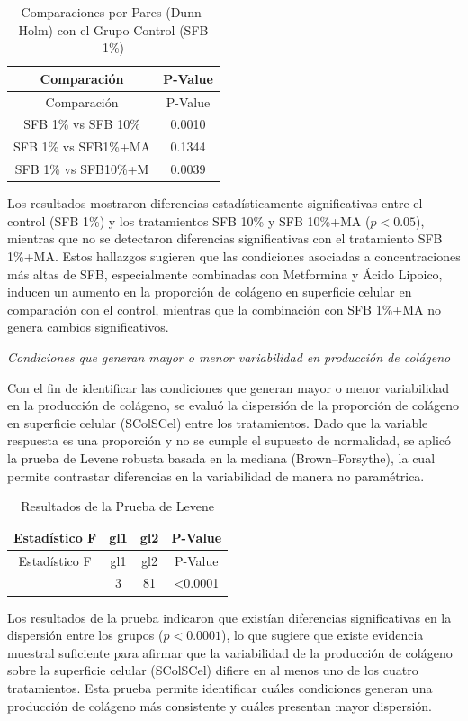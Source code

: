 \documentclass[
  11pt,
]{article}
\begin{document}
\begin{longtable}[]{@{}cc@{}}
\caption{Comparaciones por Pares (Dunn-Holm) con el Grupo Control (SFB
1\%)}\tabularnewline
\toprule\noalign{}
Comparación & P-Value \\
\midrule\noalign{}
\endfirsthead
\toprule\noalign{}
Comparación & P-Value \\
\midrule\noalign{}
\endhead
\bottomrule\noalign{}
\endlastfoot
SFB 1\% vs SFB 10\% & 0.0010 \\
SFB 1\% vs SFB1\%+MA & 0.1344 \\
SFB 1\% vs SFB10\%+M & 0.0039 \\
\end{longtable}

Los resultados mostraron diferencias estadísticamente significativas
entre el control (SFB 1\%) y los tratamientos SFB 10\% y SFB 10\%+MA
(\(p < 0.05\)), mientras que no se detectaron diferencias significativas
con el tratamiento SFB 1\%+MA. Estos hallazgos sugieren que las
condiciones asociadas a concentraciones más altas de SFB, especialmente
combinadas con Metformina y Ácido Lipoico, inducen un aumento en la
proporción de colágeno en superficie celular en comparación con el
control, mientras que la combinación con SFB 1\%+MA no genera cambios
significativos.

\emph{Condiciones que generan mayor o menor variabilidad en producción
de colágeno}

Con el fin de identificar las condiciones que generan mayor o menor
variabilidad en la producción de colágeno, se evaluó la dispersión de la
proporción de colágeno en superficie celular (SColSCel) entre los
tratamientos. Dado que la variable respuesta es una proporción y no se
cumple el supuesto de normalidad, se aplicó la prueba de Levene robusta
basada en la mediana (Brown--Forsythe), la cual permite contrastar
diferencias en la variabilidad de manera no paramétrica.

\begin{longtable}[]{@{}cccc@{}}
\caption{Resultados de la Prueba de Levene}\tabularnewline
\toprule\noalign{}
Estadístico F & gl1 & gl2 & P-Value \\
\midrule\noalign{}
\endfirsthead
\toprule\noalign{}
Estadístico F & gl1 & gl2 & P-Value \\
\midrule\noalign{}
\endhead
\bottomrule\noalign{}
\endlastfoot
13.2888 & 3 & 81 & \textless0.0001 \\
\end{longtable}

Los resultados de la prueba indicaron que existían diferencias
significativas en la dispersión entre los grupos (\(p < 0.0001\)), lo
que sugiere que existe evidencia muestral suficiente para afirmar que la
variabilidad de la producción de colágeno sobre la superficie celular
(SColSCel) difiere en al menos uno de los cuatro tratamientos. Esta
prueba permite identificar cuáles condiciones generan una producción de
colágeno más consistente y cuáles presentan mayor dispersión.
\end{document}
